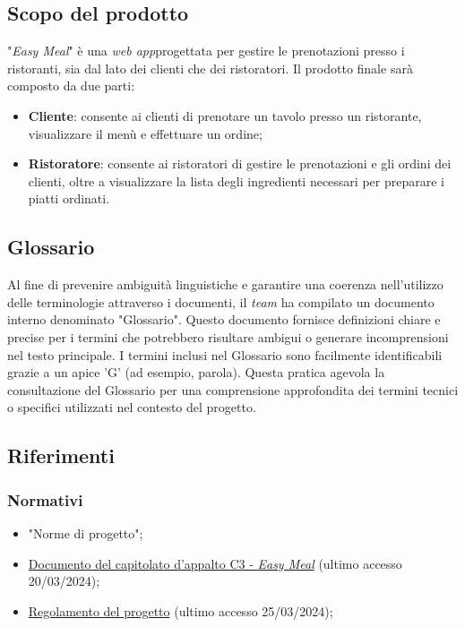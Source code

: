 \subsection{Scopo del prodotto}

"\textit{Easy Meal}" è una \textit{web app}\g progettata per gestire le
prenotazioni presso i ristoranti, sia dal lato dei clienti che dei ristoratori.
Il prodotto finale sarà composto da due parti:

\begin{itemize}
	\item \textbf{Cliente\g}: consente ai clienti di prenotare un tavolo presso un
	      ristorante, visualizzare il menù e effettuare un ordine\g;

	\item \textbf{Ristoratore}: consente ai ristoratori di gestire le
	      prenotazioni e gli ordini dei clienti, oltre a visualizzare la lista
	      degli ingredienti necessari per preparare i piatti ordinati.
\end{itemize}

\subsection{Glossario}

Al fine di prevenire ambiguità linguistiche e garantire una coerenza nell'utilizzo
delle terminologie attraverso i documenti, il \textit{team} ha compilato un documento
interno denominato "Glossario".
Questo documento fornisce definizioni chiare e precise per i termini che potrebbero
risultare ambigui o generare incomprensioni nel testo principale.
I termini inclusi nel Glossario sono facilmente identificabili grazie a un apice 'G'
(ad esempio, parola\g).
Questa pratica agevola la consultazione del Glossario per una comprensione approfondita
dei termini tecnici o specifici utilizzati nel contesto del progetto.

\subsection{Riferimenti}

\subsubsection{Normativi}
\begin{itemize}
	\item "Norme di progetto";
	\item 	\href{https://www.math.unipd.it/~tullio/IS-1/2023/Progetto/C3.pdf}
	      {Documento del capitolato d'appalto C3 - \textit{Easy Meal}} (ultimo accesso 20/03/2024);
	\item \href{https://www.math.unipd.it/~tullio/IS-1/2023/Dispense/PD2.pdf}
	      {Regolamento del progetto} (ultimo accesso 25/03/2024);
\end{itemize}

